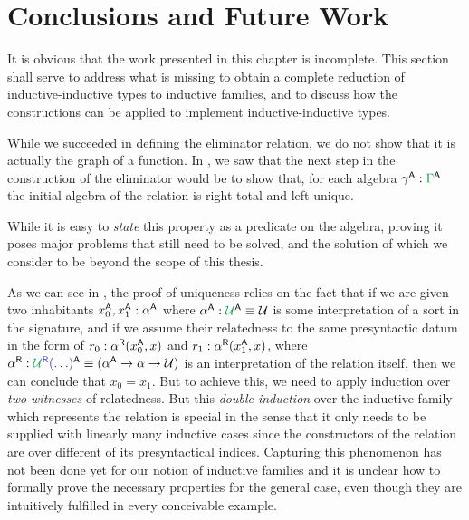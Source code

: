 \section{Conclusions and Future Work}

It is obvious that the work presented in this chapter is incomplete.
This section shall serve to address what is missing to obtain a complete
reduction of inductive-inductive types to inductive families,
and to discuss how the constructions can be applied to implement inductive-inductive
types.

\begin{remark}
While we succeeded in defining the eliminator relation, we do not show that it
is actually the graph of a function.
In , we saw that the next step in the construction of the
eliminator would be to show that, for each algebra $\gamma^\CC : \grm{\Gamma}^\CC$
the initial algebra of the relation
\tqm{\grm{\Gamma}^\RR(\blm{\IFcon{\grm{\Gamma}^\EE}}, \blm{\gamma^\CC})}
is right-total and left-unique.

While it is easy to \emph{state} this property as a predicate on the algebra,
proving it poses major problems that still need to be solved,
and the solution of which we consider to be beyond the scope of this thesis.

As we can see in , the proof of uniqueness
relies on the fact that if we are given two inhabitants $x^{\mathsf{A}}_0, x^{\mathsf{A}}_1 : \alpha^{\mathsf{A}}$
where $\alpha^\CC : \grm{\UU}^\CC \equiv \UU$ is some interpretation of a
sort in the signature, and if we assume their relatedness to the same presyntactic
datum in the form of $r_0 : \alpha^{\mathsf{R}}(x^{\mathsf{A}}_0, x)$ and $r_1 : \alpha^{\mathsf{R}}(x^{\mathsf{A}}_1, x)$,
where $\alpha^\RR : \tqm{\grm{\UU}^\RR(\ldots)}^\CC \equiv (\alpha^\CC \to \alpha \to \UU)$
is an interpretation of the relation itself,
then we can conclude that $x_0 = x_1$.
But to achieve this, we need to apply induction over \emph{two witnesses} of
relatedness.
But this \emph{double induction} over the inductive family which represents the
relation is special in the sense that it only needs to be supplied with
linearly many inductive cases
since the constructors of the relation are over different of its presyntactical
indices.
Capturing this phenomenon has not been done yet for our notion of
inductive families and
it is unclear how to formally prove the necessary properties for the
general case, even though they are intuitively fulfilled in every conceivable
example.


\end{remark}
